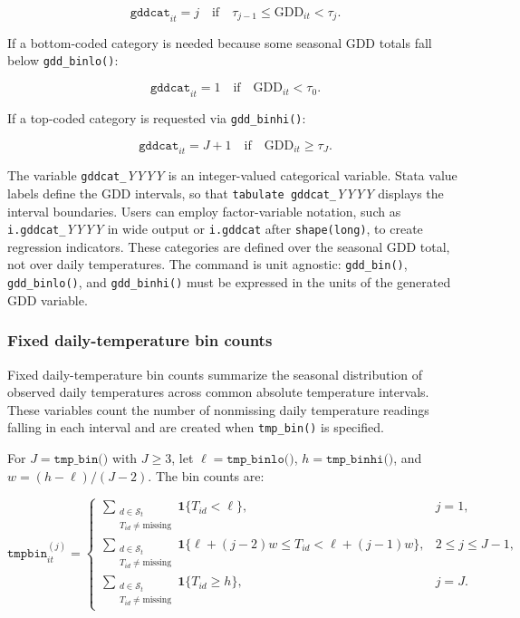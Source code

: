 \begin{equation}
	\texttt{gddcat}_{it} = j \quad \text{if} \quad \tau_{j-1} \leq \text{GDD}_{it} < \tau_j.
\end{equation}

\noindent If a bottom-coded category is needed because some seasonal GDD totals fall below \texttt{gdd\_binlo()}:

\begin{equation}
	\texttt{gddcat}_{it} = 1 \quad \text{if} \quad \text{GDD}_{it} < \tau_0.
\end{equation}

\noindent If a top-coded category is requested via \texttt{gdd\_binhi()}:

\begin{equation}
	\texttt{gddcat}_{it} = J + 1 \quad \text{if} \quad \text{GDD}_{it} \geq \tau_J.
\end{equation}

\noindent The variable \texttt{gddcat\_}\textit{YYYY} is an integer-valued categorical variable. Stata value labels define the GDD intervals, so that \texttt{tabulate gddcat\_}\textit{YYYY} displays the interval boundaries. Users can employ factor-variable notation, such as \texttt{i.gddcat\_}\textit{YYYY} in wide output or \texttt{i.gddcat} after \texttt{shape(long)}, to create regression indicators. These categories are defined over the seasonal GDD total, not over daily temperatures. The command is unit agnostic: \texttt{gdd\_bin()}, \texttt{gdd\_binlo()}, and \texttt{gdd\_binhi()} must be expressed in the units of the generated GDD variable.

\subsubsection{Fixed daily-temperature bin counts}

Fixed daily-temperature bin counts summarize the seasonal distribution of observed daily temperatures across common absolute temperature intervals. These variables count the number of nonmissing daily temperature readings falling in each interval and are created when \texttt{tmp\_bin()} is specified.

For $J = \texttt{tmp\_bin()}$ with $J \geq 3$, let $\ell = \texttt{tmp\_binlo()}$, $h = \texttt{tmp\_binhi()}$, and $w = (h - \ell) / (J - 2)$. The bin counts are:

\begin{equation}
	\texttt{tmpbin}_{it}^{(j)} =
	\begin{cases}
		\displaystyle\sum_{\substack{d \in \mathcal{S}_{t} \\ T_{id} \neq \text{missing}}} \mathbf{1}\{T_{id} < \ell\}, & j = 1, \\[8pt]
		\displaystyle\sum_{\substack{d \in \mathcal{S}_{t} \\ T_{id} \neq \text{missing}}} \mathbf{1}\{\ell + (j - 2)w \leq T_{id} < \ell + (j - 1)w\}, & 2 \leq j \leq J - 1, \\[8pt]
		\displaystyle\sum_{\substack{d \in \mathcal{S}_{t} \\ T_{id} \neq \text{missing}}} \mathbf{1}\{T_{id} \geq h\}, & j = J.
	\end{cases}
\end{equation}

